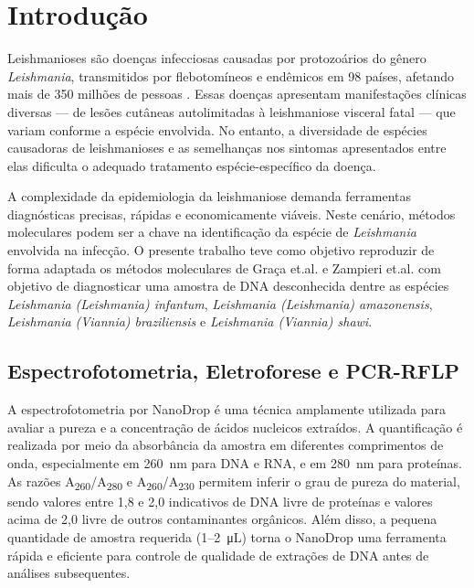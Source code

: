 \section{Introdução}

Leishmanioses são doenças infecciosas causadas por protozoários do gênero
\textit{Leishmania}, transmitidos por flebotomíneos e endêmicos em 98 países,
afetando mais de 350 milhões de pessoas \cite{hong2020one}. Essas doenças
apresentam manifestações clínicas diversas — de lesões cutâneas autolimitadas à
leishmaniose visceral fatal — que variam conforme a espécie envolvida. No
entanto, a diversidade de espécies causadoras de leishmanioses e as semelhanças
nos sintomas apresentados entre elas dificulta o adequado tratamento
espécie-específico da doença.

A complexidade da epidemiologia da leishmaniose demanda ferramentas diagnósticas
precisas, rápidas e economicamente viáveis.  Neste cenário, métodos moleculares
podem ser a chave na identificação da espécie de \textit{Leishmania} envolvida
na infecção. O presente trabalho teve como objetivo reproduzir de forma adaptada
os métodos moleculares de Graça et.al.\cite{RFLPgraca2012} e Zampieri
et.al.\cite{HRMzampi2016} com objetivo de diagnosticar uma amostra de DNA
desconhecida dentre as espécies \textit{Leishmania (Leishmania) infantum},
\textit{Leishmania (Leishmania) amazonensis}, \textit{Leishmania (Viannia)
braziliensis} e \textit{Leishmania (Viannia) shawi}. 

\subsection{Espectrofotometria, Eletroforese e PCR-RFLP}

A espectrofotometria por NanoDrop é uma técnica amplamente utilizada para avaliar a pureza e a 
concentração de ácidos nucleicos extraídos. A quantificação é realizada por meio da absorbância da 
amostra em diferentes comprimentos de onda, especialmente em \SI{260}{\nano\meter} para DNA e RNA, 
e em \SI{280}{\nano\meter} para proteínas. As razões A\textsubscript{260}/A\textsubscript{280} e A\textsubscript{260}/A\textsubscript{230} permitem 
inferir o grau de pureza do material, sendo valores entre 1{,}8 e 2{,}0 indicativos de DNA livre de proteínas 
e valores acima de 2{,}0 livre de outros contaminantes orgânicos\cite{nanodrop}. Além disso, a pequena quantidade de amostra requerida (1–2~\si{\micro\liter}) 
torna o NanoDrop uma ferramenta rápida e eficiente para controle de qualidade de extrações de DNA antes de análises subsequentes.

